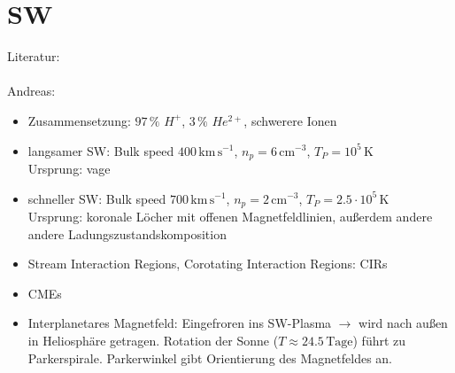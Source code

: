 \documentclass[]{article}
\begin{document}
\section{SW}
Literatur: \cite{vasyl_siscoe_1976, aschwanden_book, geiss_1995, cranmer_2012}
\\ \\
Andreas:
\begin{itemize}
\item Zusammensetzung: $97\,\% \,\,H^+$, $3\,\% \,\,He^{2+}$, schwerere Ionen
\item langsamer SW: Bulk speed $400\,\mathrm{km\,s^{-1}}$, $n_p = 6 \, \mathrm{cm^{-3}}$, $T_P = 10^5 \,\mathrm{K}$ \\
Ursprung: vage
\item schneller SW: Bulk speed $700\,\mathrm{km\,s^{-1}}$, $n_p = 2 \, \mathrm{cm^{-3}}$, $T_P = 2.5 \cdot 10^5 \,\mathrm{K}$\\
Ursprung: koronale Löcher mit offenen Magnetfeldlinien, außerdem andere andere Ladungszustandskomposition
\item Stream Interaction Regions, Corotating Interaction Regions: CIRs
\item CMEs
\item Interplanetares Magnetfeld: Eingefroren ins SW-Plasma $\rightarrow$ wird nach außen in Heliosphäre getragen. Rotation der Sonne ($T \approx 24.5 \,\mathrm{Tage}$) führt zu Parkerspirale. Parkerwinkel gibt Orientierung des Magnetfeldes an.
\end{itemize}
%
%
%
\end{document}

